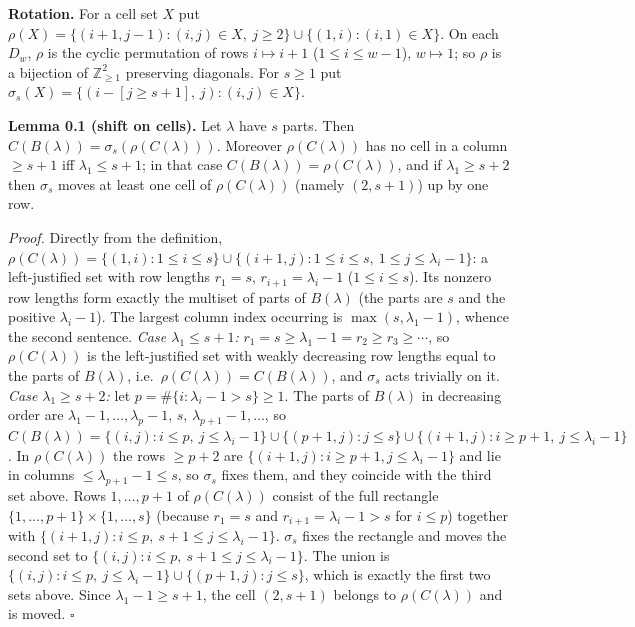\textbf{Rotation.} For a cell set \(X\) put
\(\rho(X)=\{(i+1,j-1):(i,j)\in X,\ j\ge2\}\cup\{(1,i):(i,1)\in X\}\). On
each \(D_w\), \(\rho\) is the cyclic permutation of rows
\(i\mapsto i+1\) (\(1\le i\le w-1\)), \(w\mapsto1\); so \(\rho\) is a
bijection of \(\mathbb Z_{\ge1}^2\) preserving diagonals. For \(s\ge1\)
put \(\sigma_s(X)=\{(i-[j\ge s+1],\,j):(i,j)\in X\}\).

\textbf{Lemma 0.1 (shift on cells).} Let \(\lambda\) have \(s\) parts.
Then \(C(B(\lambda))=\sigma_s(\rho(C(\lambda)))\). Moreover
\(\rho(C(\lambda))\) has no cell in a column \(\ge s+1\) iff
\(\lambda_1\le s+1\); in that case \(C(B(\lambda))=\rho(C(\lambda))\),
and if \(\lambda_1\ge s+2\) then \(\sigma_s\) moves at least one cell of
\(\rho(C(\lambda))\) (namely \((2,s+1)\)) up by one row.

\emph{Proof.} Directly from the definition,
\(\rho(C(\lambda))=\{(1,i):1\le i\le s\}\cup\{(i+1,j):1\le i\le s,\ 1\le j\le\lambda_i-1\}\):
a left-justified set with row lengths \(r_1=s\), \(r_{i+1}=\lambda_i-1\)
(\(1\le i\le s\)). Its nonzero row lengths form exactly the multiset of
parts of \(B(\lambda)\) (the parts are \(s\) and the positive
\(\lambda_i-1\)). The largest column index occurring is
\(\max(s,\lambda_1-1)\), whence the second sentence. \emph{Case
\(\lambda_1\le s+1\):} \(r_1=s\ge\lambda_1-1=r_2\ge r_3\ge\cdots\), so
\(\rho(C(\lambda))\) is the left-justified set with weakly decreasing
row lengths equal to the parts of \(B(\lambda)\),
i.e.~\(\rho(C(\lambda))=C(B(\lambda))\), and \(\sigma_s\) acts trivially
on it. \emph{Case \(\lambda_1\ge s+2\):} let
\(p=\#\{i:\lambda_i-1>s\}\ge1\). The parts of \(B(\lambda)\) in
decreasing order are
\(\lambda_1-1,\dots,\lambda_p-1,\,s,\,\lambda_{p+1}-1,\dots\), so
\(C(B(\lambda))=\{(i,j):i\le p,\ j\le\lambda_i-1\}\cup\{(p+1,j):j\le s\}\cup\{(i+1,j):i\ge p+1,\ j\le\lambda_i-1\}\).
In \(\rho(C(\lambda))\) the rows \(\ge p+2\) are
\(\{(i+1,j):i\ge p+1,j\le\lambda_i-1\}\) and lie in columns
\(\le\lambda_{p+1}-1\le s\), so \(\sigma_s\) fixes them, and they
coincide with the third set above. Rows \(1,\dots,p+1\) of
\(\rho(C(\lambda))\) consist of the full rectangle
\(\{1,\dots,p+1\}\times\{1,\dots,s\}\) (because \(r_1=s\) and
\(r_{i+1}=\lambda_i-1>s\) for \(i\le p\)) together with
\(\{(i+1,j):i\le p,\ s+1\le j\le\lambda_i-1\}\). \(\sigma_s\) fixes the
rectangle and moves the second set to
\(\{(i,j):i\le p,\ s+1\le j\le\lambda_i-1\}\). The union is
\(\{(i,j):i\le p,\ j\le\lambda_i-1\}\cup\{(p+1,j):j\le s\}\), which is
exactly the first two sets above. Since \(\lambda_1-1\ge s+1\), the cell
\((2,s+1)\) belongs to \(\rho(C(\lambda))\) and is moved. \(\square\)

